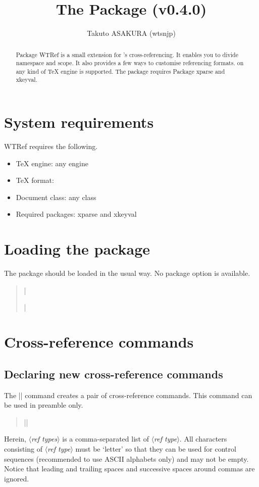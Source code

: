 \documentclass[a4paper]{article}
\title{The {\ThisPkg} Package (v0.4.0)}
\author{Takuto ASAKURA (wtsnjp)}
\newcommand{\PkgName}[1]{\textsf{#1}}
\newcommand{\ThisPkg}{\PkgName{WTRef}}
\newcommand{\Meta}[1]{$\langle$\mbox{}\textit{#1}\mbox{}$\rangle$}
\newenvironment{syntax}{\begin{quote}\small}{\end{quote}}
\begin{document}
\maketitle

\begin{abstract}
Package {\ThisPkg} is a small extension for {\LaTeXe}'s cross-referencing. It
enables you to divide namespace and scope. It also provides a few ways to
customise referencing formats. {\LaTeXe} on any kind of {\TeX} engine is
supported. The package requires Package \PkgName{xparse} and \PkgName{xkeyval}.
\end{abstract}

\section{System requirements}

{\ThisPkg} requires the following.
%
\begin{itemize}
\item {\TeX} engine: any engine
\item {\TeX} format: \LaTeXe
\item Document class: any class
\item Required packages: \PkgName{xparse} and \PkgName{xkeyval}
\end{itemize}

\section{Loading the package}

The package should be loaded in the usual {\LaTeXe} way. No package option is
available.
%
\begin{syntax}
|\usepackage{wtref}|
\end{syntax}

\section{Cross-reference commands}

\subsection{Declaring new cross-reference commands}

The |\newref| command creates a pair of cross-reference commands. This command
can be used in preamble only.
%
\begin{syntax}
|\newref[|\Meta{options}|]{|\Meta{ref types}|}|
\end{syntax}
%
Herein, \Meta{ref types} is a comma-separated list of \Meta{ref type}. All
characters consisting of \Meta{ref type} must be `letter' so that they can be
used for control sequences (recommended to use ASCII alphabets only) and may
not be empty. Notice that leading and trailing spaces and successive spaces
around commas are ignored.
\end{document}
